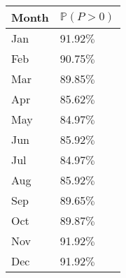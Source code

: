 \begin{tabular}{ll}
\toprule
Month & $\mathbb{P}(P > 0)$ \\
\midrule
  Jan &           91.92$\%$ \\
  Feb &           90.75$\%$ \\
  Mar &           89.85$\%$ \\
  Apr &           85.62$\%$ \\
  May &           84.97$\%$ \\
  Jun &           85.92$\%$ \\
  Jul &           84.97$\%$ \\
  Aug &           85.92$\%$ \\
  Sep &           89.65$\%$ \\
  Oct &           89.87$\%$ \\
  Nov &           91.92$\%$ \\
  Dec &           91.92$\%$ \\
\bottomrule
\end{tabular}
